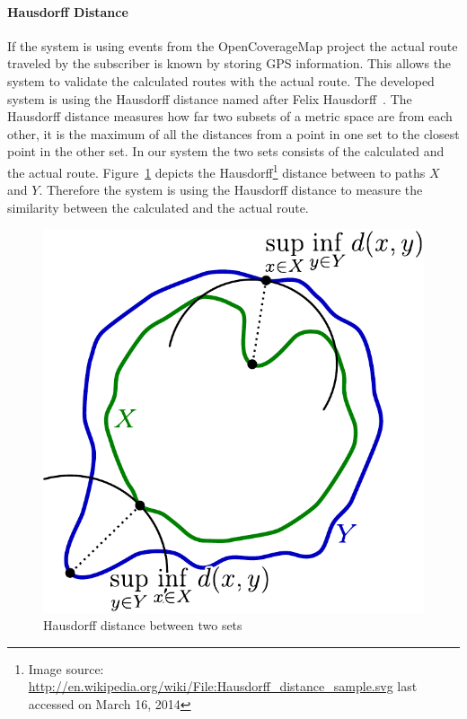 \documentclass[master,english]{hgbthesis}
\begin{document}
\paragraph{Hausdorff Distance}
If the system is using events from the OpenCoverageMap project the actual route traveled by the subscriber is known by storing GPS information. This allows the system to validate the calculated routes with the actual route. The developed system is using the Hausdorff distance named after Felix Hausdorff~\cite{Rockafellar1998}. The Hausdorff distance measures how far two subsets of a metric space are from each other, it is the maximum of all the distances from a point in one set to the closest point in the other set. In our system the two sets consists of the calculated and the actual route. Figure~\ref{fig:Hausdorff_distance_sample} depicts the Hausdorff\footnote{Image source: \url{http://en.wikipedia.org/wiki/File:Hausdorff_distance_sample.svg} last accessed on March 16, 2014 } distance between to paths $X$ and $Y$. Therefore the system is using the Hausdorff distance to measure the similarity between the calculated and the actual route.
\begin{figure}
	\centering
	\includegraphics[width=0.7\linewidth]{./images/Hausdorff_distance_sample}
	\caption{Hausdorff distance between two sets}
	\label{fig:Hausdorff_distance_sample}
\end{figure}
\end{document}
